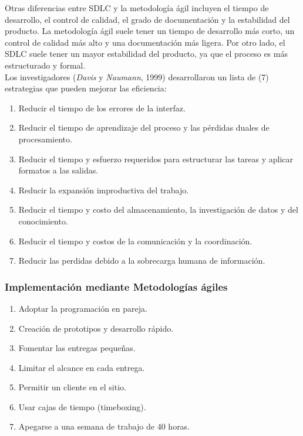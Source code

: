 \documentclass[12pt]{article}
\begin{document}
Otras diferencias entre SDLC y la metodología ágil incluyen el tiempo de desarrollo, el control de calidad, el grado de documentación y la estabilidad del producto. La metodología ágil suele tener un tiempo de desarrollo más corto, un control de calidad más alto y una documentación más ligera. Por otro lado, el SDLC suele tener un mayor estabilidad del producto, ya que el proceso es más estructurado y formal.\\

Los investigadores ({\it Davis} y {\it Naumann}, 1999) desarrollaron un lista de (7)
estrategias que pueden mejorar las eficiencia: 

\begin{enumerate}
  \item Reducir el tiempo de los errores de la interfaz.
  \item Reducir el tiempo de aprendizaje del proceso y las pérdidas duales
    de procesamiento.
  \item Reducir el tiempo y esfuerzo requeridos para estructurar las tareas
    y aplicar formatos a las salidas.
  \item Reducir la expansión improductiva del trabajo.
  \item Reducir el tiempo y costo del almacenamiento, la investigación de datos
    y del conocimiento.
  \item Reducir el tiempo y costos de la comunicación y la coordinación.
  \item Reducir las perdidas debido a la sobrecarga humana de información.
\end{enumerate}


\subsubsection{Implementación mediante Metodologías ágiles}
\begin{enumerate}
  \item Adoptar la programación en pareja.
  \item Creación de prototipos y  desarrollo rápido.
  \item Fomentar las entregas pequeñas.
  \item Limitar el alcance en cada entrega.
  \item Permitir un cliente en el sitio.
  \item Usar cajas de tiempo (timeboxing).
  \item Apegarse a una semana de trabajo de 40 horas.
\end{enumerate}
\end{document}
